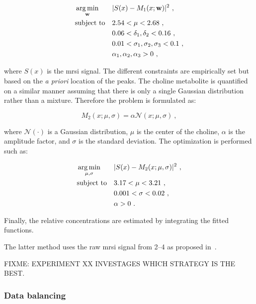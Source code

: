 \documentclass[a4paper,num-refs]{wiley-article}
\begin{document}
\begin{equation}
\begin{aligned}
& \operatorname*{arg\,min}_{\mathbf{w}} 
& & | S(x) - M_1(x; \mathbf{w}) |^{2} \ , \label{eq:mincostcit} \\
& \text{subject to}
& & 2.54 < \mu < 2.68 \ , \\
&&& 0.06 < \delta_1, \delta_2 < 0.16 \ , \\
&&& 0.01 < \sigma_1, \sigma_2, \sigma_3 < 0.1 \ , \\
&&& \alpha_1, \alpha_2, \alpha_3 > 0 \ ,
\end{aligned}
\end{equation}

\noindent where $S(x)$ is the \ac{mrsi} signal. The different constraints are
empirically set but based on the \emph{a priori} location of the peaks.
The choline metabolite is quantified on a similar manner assuming that there is
only a single Gaussian distribution rather than a mixture. Therefore the
problem is formulated as:

\begin{equation}
  M_2(x; \mu, \sigma) = \alpha \mathcal{N}(x; \mu, \sigma) \ ,
  \label{eq:costcho}
\end{equation}

\noindent where $\mathcal{N}(\cdot)$ is a Gaussian distribution, $\mu$ is the
center of the choline, $\alpha$ is the amplitude factor, and $\sigma$ is the
standard deviation. The optimization is performed such as:

\begin{equation}
\begin{aligned}
& \operatorname*{arg\,min}_{\mathbf{\mu, \sigma}} 
& & | S(x) - M_2(x; \mu, \sigma) |^{2} \ , \label{eq:mincostcho} \\
& \text{subject to}
& & 3.17 < \mu < 3.21 \ , \\
&&& 0.001 < \sigma < 0.02 \ , \\
&&& \alpha > 0 \ .
\end{aligned}
\end{equation}

Finally, the relative concentrations are estimated by integrating the fitted
functions.

The latter method uses the raw \ac{mrsi} signal from \SIrange{2}{4}{\ppm} as
proposed in~\cite{Parfait2012}.

FIXME: EXPERIMENT XX INVESTAGES WHICH STRATEGY IS THE BEST.

\subsubsection{Data balancing}
\end{document}
